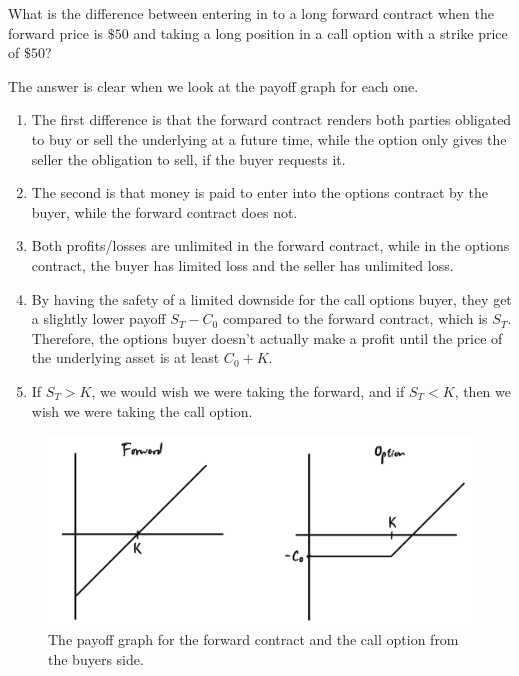 \documentclass{article}
\begin{document}
  \begin{exercise}[Hull 1.3]
    What is the difference between entering in to a long forward contract when the forward price is $\$50$ and taking a long position in a call option with a strike price of $\$50$? 
  \end{exercise}
  \begin{solution}
    The answer is clear when we look at the payoff graph for each one.  
    \begin{enumerate}
      \item The first difference is that the forward contract renders both parties obligated to buy or sell the underlying at a future time, while the option only gives the seller the obligation to sell, if the buyer requests it.  
      \item The second is that money is paid to enter into the options contract by the buyer, while the forward contract does not. 
      \item Both profits/losses are unlimited in the forward contract, while in the options contract, the buyer has limited loss and the seller has unlimited loss. 
      \item By having the safety of a limited downside for the call options buyer, they get a slightly lower payoff $S_T - C_0$ compared to the forward contract, which is $S_T$. Therefore, the options buyer doesn't actually make a profit until the price of the underlying asset is at least $C_0 + K$. 
      \item If $S_T > K$, we would wish we were taking the forward, and if $S_T < K$, then we wish we were taking the call option.  
    \end{enumerate}
    \begin{figure}[H]
      \centering 
      \includegraphics[scale=0.4]{img/ex1-3.png}
      \caption{The payoff graph for the forward contract and the call option from the buyers side.} 
      \label{fig:ex1-3}
    \end{figure}
  \end{solution}
\end{document}
